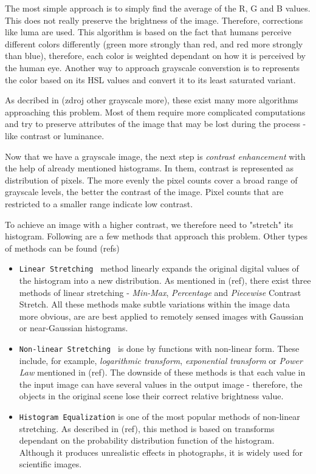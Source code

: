 The most simple approach is to simply find the average of the R, G and B values. This does not really preserve the brightness of the image. Therefore, corrections like luma are used. This algorithm is based on the fact that humans perceive different colors differently (green more strongly than red, and red more strongly than blue), therefore, each color is weighted dependant on how it is perceived by the human eye. Another way to approach grayscale converstion is to represents the color based on its HSL values and convert it to its least saturated variant.

As decribed in (zdroj other grayscale more), these exist many more algorithms approaching this problem. Most of them require more complicated computations and try to preserve attributes of the image that may be lost during the process - like contrast or luminance.

Now that we have a grayscale image, the next step is \emph{contrast enhancement} with the help of already mentioned histograms. In them, contrast is represented as distribution of pixels. The more evenly the pixel counts cover a broad range of grayscale levels, the better the contrast of the image.  Pixel counts that are restricted to a smaller range indicate low contrast.

To achieve an image with a higher contrast, we therefore need to "stretch" its histogram. Following are a few methods that approach this problem. Other types of methods can be found (refs)

\begin{itemize}

\item\texttt{Linear Stretching } method linearly expands the original digital values of the histogram into a new distribution. As mentioned in (ref), there exist three methods of linear stretching - \emph{Min-Max}, \emph{Percentage} and \emph{Piecewise} Contrast Stretch. All these methods make subtle variations within the image data more obvious, are are best applied to remotely
sensed images with Gaussian or near-Gaussian histograms.

\item\texttt{Non-linear Stretching } is done by functions with non-linear form. These include, for example, \emph{logarithmic transform}, \emph{exponential transform} or \emph{Power Law} mentioned in (ref). The downside of these methods is that each value in the input image can have several values in the output image - therefore, the objects in the original scene lose their correct relative brightness value.

\item\texttt{Histogram Equalization} is one of the most popular methods of non-linear stretching. As described in (ref), this method is based on transforms dependant on the probability distribution function of the histogram. Although it produces unrealistic effects in photographs, it is widely used for scientific images.

\end{itemize}

